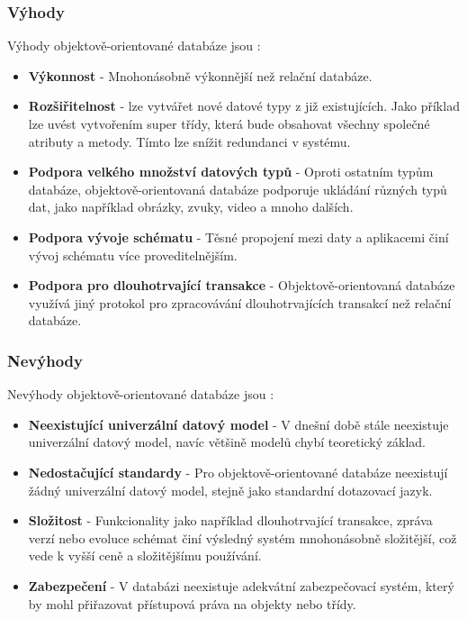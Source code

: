 \subsubsection{Výhody}
Výhody objektově-orientované databáze jsou \cite{advantages_oo}:
\begin{itemize}
\item \textbf{Výkonnost} - Mnohonásobně výkonnější než relační databáze.
\item \textbf{Rozšiřitelnost} - lze vytvářet nové datové typy z již existujících. Jako příklad lze uvést vytvořením super třídy, která bude obsahovat všechny společné atributy a metody. Tímto lze snížit redundanci v systému.
\item \textbf{Podpora velkého množství datových typů} - Oproti ostatním typům databáze, objektově-orientovaná databáze podporuje ukládání různých typů dat, jako například obrázky, zvuky, video a mnoho dalších.
\item \textbf{Podpora vývoje schématu} - Těsné propojení mezi daty a aplikacemi činí vývoj schématu více proveditelnějším.
\item \textbf{Podpora pro dlouhotrvající transakce} - Objektově-orientovaná databáze využívá jiný protokol pro zpracovávání dlouhotrvajících transakcí než relační databáze.
\end{itemize}

\subsubsection{Nevýhody}
Nevýhody objektově-orientované databáze jsou \cite{advantages_oo}:
\begin{itemize}
\item \textbf{Neexistující univerzální datový model} - V dnešní době stále neexistuje univerzální datový model, navíc většině modelů chybí teoretický základ.
\item \textbf{Nedostačující standardy} - Pro objektově-orientované databáze neexistují žádný univerzální datový model, stejně jako standardní dotazovací jazyk.
\item \textbf{Složitost} - Funkcionality jako například dlouhotrvající transakce, zpráva verzí nebo evoluce schémat činí výsledný systém mnohonásobně složitější, což vede k vyšší ceně a složitějšímu používání.
\item \textbf{Zabezpečení} - V databázi neexistuje adekvátní zabezpečovací systém, který by mohl přiřazovat přístupová práva na objekty nebo třídy.
\end{itemize}

